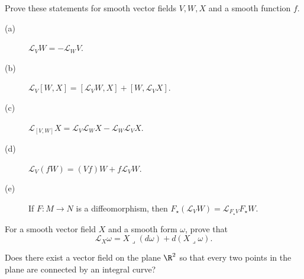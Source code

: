 \documentclass[12pt]{pset}
\newcommand{\LL}{\mathcal{L}}
\begin{document}
\vfill
\vfill

\pagebreak

\begin{problem}
  Prove these statements for smooth vector fields $V, W, X$ and a
  smooth function $f$.
  \begin{description}
  \item[(a)] $\LL_V W = -\LL_W V$.
  \item[(b)] $\LL_V[W,X] = [\LL_V W,X] + [W,\LL_V X]$.
  \item[(c)] $\LL_{[V,W]} X = \LL_V \LL_W X - \LL_W \LL_V X$.
  \item[(d)] $\LL_V(fW) = (Vf) W + f \LL_V W$.
  \item[(e)] If $F : M \to N$ is a diffeomorphism, then $F_\star(\LL_V
    W) = \LL_{F_\star V} F_\star W$.
  \end{description}

\end{problem}
\vfill
\begin{problem}

\newcommand{\InteriorMultiplication}{\lrcorner}
For a smooth vector field $X$ and a smooth form $\omega$, prove that
$$
\LL_X \omega = X \InteriorMultiplication (d\omega) + d(X
\InteriorMultiplication \omega).
$$  

\end{problem}

\vfill

\begin{hardproblem}

Does there exist a vector field on the plane $\R^2$ so that every two
points in the plane are connected by an integral curve?
  
\end{hardproblem}

\vfill
\end{document}
